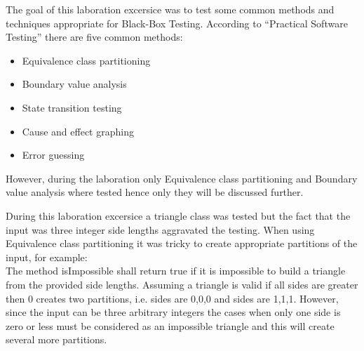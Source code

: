 The goal of this laboration excersice was to test some common methods and techniques appropriate for Black-Box Testing.
According to "`Practical Software Testing"' there are five common methods:
\begin{itemize}
	\item Equivalence class partitioning
	\item Boundary value analysis
	\item State transition testing
	\item Cause and effect graphing
	\item Error guessing
\end{itemize}

However, during the laboration only Equivalence class partitioning and Boundary value analysis where tested hence only they will be discussed further.

During this laboration excersice a triangle class was tested but the fact that the input was three integer side lengths aggravated the testing. 
When using Equivalence class partitioning it was tricky to create appropriate partitions of the input, for example:\\
The method isImpossible shall return true if it is impossible to build a triangle from the provided side lengths. 
Assuming a triangle is valid if all sides are greater then 0 creates two partitions, i.e. sides are 0,0,0 and sides are 1,1,1. 
However, since the input can be three arbitrary integers the cases when only one side is zero or less must be considered as an impossible triangle and this will create several more partitions.